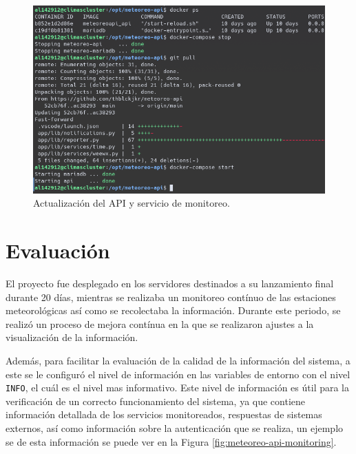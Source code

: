 \begin{figure}[!ht]
	\centering
	\includegraphics[width=0.9\linewidth]{images/screenshots/meteoreo-api-update.png}
	\caption{Actualización del API y servicio de monitoreo.}
	\label{fig:updating-api}
\end{figure}

\section{Evaluación}

El proyecto fue desplegado en los servidores destinados a su lanzamiento final durante 20 días, mientras se realizaba un monitoreo contínuo de las estaciones meteorológicas así como se recolectaba la información. Durante este periodo, se realizó un proceso de mejora contínua en la que se realizaron ajustes a la visualización de la información.

Además, para facilitar la evaluación de la calidad de la información del sistema, a este se le configuró el nivel de información en las variables de entorno con el nivel \texttt{INFO}, el cuál es el nivel mas informativo. Este nivel de información es útil para la verificación de un correcto funcionamiento del sistema, ya que contiene información detallada de los servicios monitoreados, respuestas de sistemas externos, así como información sobre la autenticación que se realiza, un ejemplo se de esta información se puede ver en la Figura \ref{fig:meteoreo-api-monitoring}.

